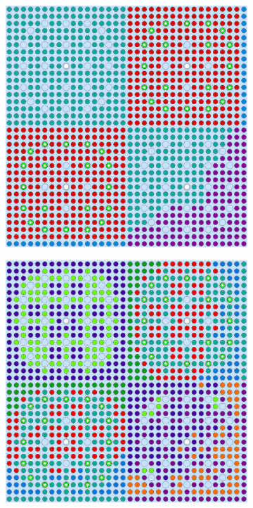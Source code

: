 \begin{figure}[h!]
\begin{subfigure}{0.48\textwidth}
  \includegraphics[width=0.9\linewidth]{figures/unsupervised/geometries/with-features/2-clusters/combined/reflector}
  \caption{}
  \label{fig:chap10-reflector-combined-2}
\end{subfigure}
\begin{subfigure}{0.48\textwidth}
  \centering
  \includegraphics[width=0.9\linewidth]{figures/unsupervised/geometries/with-features/4-clusters/pinch/reflector}

\end{subfigure}
\end{figure}
